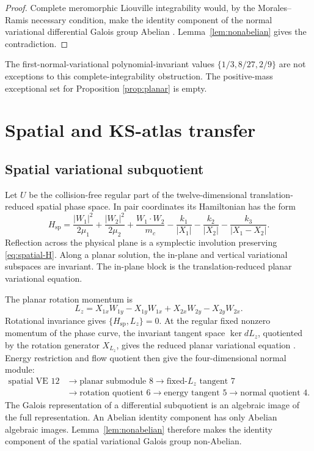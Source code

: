 \documentclass[11pt]{article}
\theoremstyle{definition}
\theoremstyle{remark}
\begin{document}
\begin{proof}
Complete meromorphic Liouville integrability would, by the
Morales--Ramis necessary condition, make the identity component of the
normal variational differential Galois group Abelian
\cite{moralesramis2001}.  Lemma~\ref{lem:nonabelian} gives the contradiction.
\end{proof}

The first-normal-variational polynomial-invariant values
\(\{1/3,8/27,2/9\}\) are not exceptions to this complete-integrability
obstruction.  The positive-mass exceptional set for Proposition
\ref{prop:planar} is empty.

\section{Spatial and KS-atlas transfer}
\label{sec:transfer}

\subsection{Spatial variational subquotient}

Let \(U\) be the collision-free regular part of the twelve-dimensional
translation-reduced spatial phase space.  In pair coordinates its Hamiltonian
has the form
\begin{equation}
H_{\mathrm{sp}}=
\frac{|W_1|^2}{2\mu_1}+\frac{|W_2|^2}{2\mu_2}
+\frac{W_1\cdot W_2}{m_c}
-\frac{k_1}{|X_1|}-\frac{k_2}{|X_2|}
-\frac{k_3}{|X_1-X_2|}.
\label{eq:spatial-H}
\end{equation}
Reflection across the physical plane is a symplectic involution preserving
\eqref{eq:spatial-H}.  Along a planar solution, the in-plane and vertical
variational subspaces are invariant.  The in-plane block is the
translation-reduced planar variational equation.

The planar rotation momentum is
\[
L_z=X_{1x}W_{1y}-X_{1y}W_{1x}
   +X_{2x}W_{2y}-X_{2y}W_{2x}.
\]
Rotational invariance gives \(\{H_{\mathrm{sp}},L_z\}=0\).
At the regular fixed nonzero momentum of the phase curve, the invariant
tangent space \(\ker dL_z\), quotiented by the rotation generator
\(X_{L_z}\), gives the reduced planar variational equation
\cite{marsdenweinstein1974}.  Energy restriction and flow quotient then
give the four-dimensional normal module:
\[
\begin{aligned}
\text{spatial VE }12
&\longrightarrow \text{planar submodule }8
\longrightarrow \text{fixed-}L_z\text{ tangent }7\\
&\longrightarrow \text{rotation quotient }6
\longrightarrow \text{energy tangent }5
\longrightarrow \text{normal quotient }4.
\end{aligned}
\]
The Galois representation of a differential subquotient is an algebraic
image of the full representation.  An Abelian identity component has only
Abelian algebraic images.  Lemma~\ref{lem:nonabelian} therefore makes the
identity component of the spatial variational Galois group non-Abelian.
\end{document}
